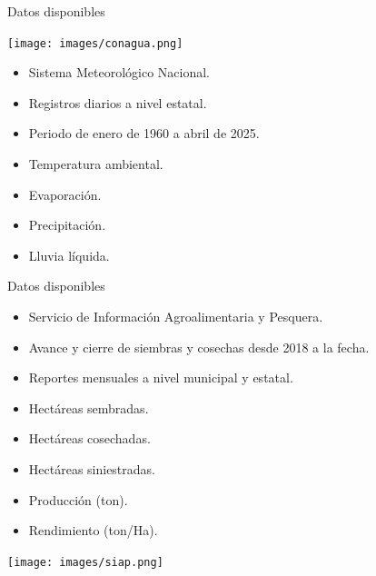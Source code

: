 \documentclass[aspectratio=169]{beamer}
\begin{document}
\begin{frame}{Datos disponibles}
    \vspace{-1cm}
    \begin{minipage}{0.5\textwidth}
			\hspace{-0.5cm}
            \centering
            \texttt{[image: images/conagua.png]}
		\end{minipage}%
		\begin{minipage}{0.5\textwidth}
            \begin{block}{}
                \begin{itemize}
                    \item Sistema Meteorológico Nacional.
				\item Registros diarios a nivel estatal.
                    \item Periodo de enero de 1960 a abril de 2025.
                    \item Temperatura ambiental.
                    \item Evaporación.
                    \item Precipitación.
                    \item Lluvia líquida.
			\end{itemize}
            \end{block}
		\end{minipage}
\end{frame}

\begin{frame}{Datos disponibles}
    \vspace{-1cm}
		\begin{minipage}{0.5\textwidth}
            \begin{block}{}
                \begin{itemize}
                    \item Servicio de Información Agroalimentaria y Pesquera.
				\item Avance y cierre de siembras y cosechas desde 2018 a la fecha.
                    \item Reportes mensuales a nivel municipal y estatal.
                    \item Hectáreas sembradas.
                    \item Hectáreas cosechadas.
                    \item Hectáreas siniestradas.
                    \item Producción (ton).
                    \item Rendimiento (ton/Ha).
			\end{itemize}
            \end{block}
		\end{minipage}%
        \begin{minipage}{0.5\textwidth}
			\hspace{0cm}
            \centering
            \texttt{[image: images/siap.png]}
		\end{minipage}
\end{frame}
\end{document}
